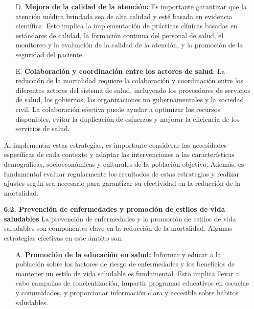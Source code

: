 \documentclass[8pt,a4paper]{beamer}
\begin{document}
{\begin{frame}{}
\begin{block}{}
\begin{enumerate}
\item[D.] \textbf{Mejora de la calidad de la atención:} Es importante garantizar que la atención médica brindada sea de alta calidad y esté basada en evidencia científica. Esto implica la implementación de prácticas clínicas basadas en estándares de calidad, la formación continua del personal de salud, el monitoreo y la evaluación de la calidad de la atención, y la promoción de la seguridad del paciente.
\end{enumerate}
\end{block}
\end{frame}


\begin{frame}{}
\begin{block}{}
\setlength{\parskip}{3px}
\justifying
\begin{enumerate}
\setlength{\parskip}{3px}
\justifying
\item[E.] \textbf{Colaboración y coordinación entre los actores de salud}: La reducción de la mortalidad requiere la colaboración y coordinación entre los diferentes actores del sistema de salud, incluyendo los proveedores de servicios de salud, los gobiernos, las organizaciones no gubernamentales y la sociedad civil. La colaboración efectiva puede ayudar a optimizar los recursos disponibles, evitar la duplicación de esfuerzos y mejorar la eficiencia de los servicios de salud.
\end{enumerate}
Al implementar estas estrategias, es importante considerar las necesidades específicas de cada contexto y adaptar las intervenciones a las características demográficas, socioeconómicas y culturales de la población objetivo. Además, es fundamental evaluar regularmente los resultados de estas estrategias y realizar ajustes según sea necesario para garantizar su efectividad en la reducción de la mortalidad.
\end{block}
\end{frame}

\begin{frame}{}
\begin{block}{\textbf{6.2. Prevención de enfermedades y promoción de estilos de vida saludables}}
\setlength{\parskip}{3px}
\justifying
La prevención de enfermedades y la promoción de estilos de vida saludables son componentes clave en la reducción de la mortalidad. Algunas estrategias efectivas en este ámbito son:
\begin{enumerate}
\setlength{\parskip}{3px}
\justifying
\item[A.] \textbf{Promoción de la educación en salud:} Informar y educar a la población sobre los factores de riesgo de enfermedades y los beneficios de mantener un estilo de vida saludable es fundamental. Esto implica llevar a cabo campañas de concientización, impartir programas educativos en escuelas y comunidades, y proporcionar información clara y accesible sobre hábitos saludables.


\end{enumerate}
\end{block}
\end{frame}}
\end{document}
